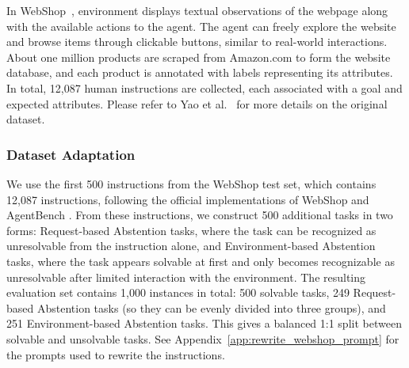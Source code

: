 \documentclass{article}
\begin{document}
In WebShop~\citep{yao2022webshop}, environment displays textual observations of the webpage along with the available actions to the agent. The agent can freely explore the website and browse items through clickable buttons, similar to real-world interactions. About one million products are scraped from Amazon.com to form the website database, and each product is annotated with labels representing its attributes. In total, 12,087 human instructions are collected, each associated with a goal and expected attributes. Please refer to Yao et al.~\cite{yao2022webshop} for more details on the original dataset.


\subsubsection{Dataset Adaptation}

We use the first 500 instructions from the WebShop test set, which contains 12,087 instructions, following the official implementations of WebShop \cite{yao2022webshop} and AgentBench \cite{liu2023agentbench}. From these instructions, we construct 500 additional tasks in two forms: Request-based Abstention tasks, where the task can be recognized as unresolvable from the instruction alone, and Environment-based Abstention tasks, where the task appears solvable at first and only becomes recognizable as unresolvable after limited interaction with the environment. The resulting evaluation set contains 1,000 instances in total: 500 solvable tasks, 249 Request-based Abstention tasks (so they can be evenly divided into three groups), and 251 Environment-based Abstention tasks. This gives a balanced 1:1 split between solvable and unsolvable tasks. See Appendix~\ref{app:rewrite_webshop_prompt} for the prompts used to rewrite the instructions.
\end{document}
